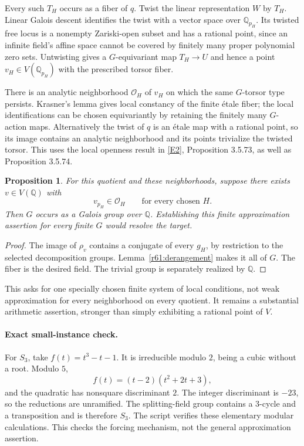 \documentclass[11pt,a4paper]{article}
\newcommand{\Q}{\mathbb{Q}}
\newcommand{\eref}[2]{\hyperlink{extra:#1:#2}{[E#2]}}
\newtheorem{notebookproposition}[notebooklemma]{Proposition}
\numberwithin{equation}{section}
\begin{document}
Every such $T_H$ occurs as a fiber of $q$. Twist the linear representation $W$ by $T_H$. Linear Galois descent identifies the twist with a vector space over $\Q_{p_H}$. Its twisted free locus is a nonempty Zariski-open subset and has a rational point, since an infinite field's affine space cannot be covered by finitely many proper polynomial zero sets. Untwisting gives a $G$-equivariant map $T_H\to U$ and hence a point $v_H\in V(\Q_{p_H})$ with the prescribed torsor fiber.

There is an analytic neighborhood $\mathcal O_H$ of $v_H$ on which the same $G$-torsor type persists. Krasner's lemma gives local constancy of the finite étale fiber; the local identifications can be chosen equivariantly by retaining the finitely many $G$-action maps. Alternatively the twist of $q$ is an étale map with a rational point, so its image contains an analytic neighborhood and its points trivialize the twisted torsor. This uses the local openness result in \eref{61}{2}, Proposition 3.5.73, as well as Proposition 3.5.74.

\begin{notebookproposition}\label{r61:approx}
For this quotient and these neighborhoods, suppose there exists $v\in V(\Q)$ with
\begin{equation}\label{r61:wa}
 v_{p_H}\in\mathcal O_H\qquad\text{for every chosen }H.
\end{equation}
Then $G$ occurs as a Galois group over $\Q$. Establishing this finite approximation assertion for every finite $G$ would resolve the target.
\end{notebookproposition}
\begin{proof}
The image of $\rho_v$ contains a conjugate of every $g_H$, by restriction to the selected decomposition groups. Lemma~\ref{r61:derangement} makes it all of $G$. The fiber is the desired field. The trivial group is separately realized by $\Q$.
\end{proof}

This asks for one specially chosen finite system of local conditions, not weak approximation for every neighborhood on every quotient. It remains a substantial arithmetic assertion, stronger than simply exhibiting a rational point of $V$.

\paragraph{Exact small-instance check.}
For $S_3$, take $f(t)=t^3-t-1$. It is irreducible modulo $2$, being a cubic without a root. Modulo $5$,
\[
 f(t)=(t-2)(t^2+2t+3),
\]
and the quadratic has nonsquare discriminant $2$. The integer discriminant is $-23$, so the reductions are unramified. The splitting-field group contains a $3$-cycle and a transposition and is therefore $S_3$. The script verifies these elementary modular calculations. This checks the forcing mechanism, not the general approximation assertion.
\end{document}
